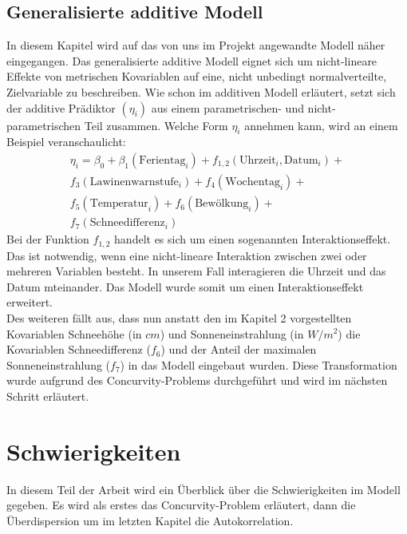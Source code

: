 \subsection{Generalisierte additive Modell}
In diesem Kapitel wird auf das von uns im Projekt angewandte Modell näher eingegangen. Das generalisierte additive Modell eignet sich um nicht-lineare Effekte von metrischen Kovariablen auf eine, nicht unbedingt normalverteilte, Zielvariable zu beschreiben. Wie schon im additiven Modell erläutert, setzt sich der additive Prädiktor $(\eta_{i})$ aus einem parametrischen- und nicht-parametrischen Teil zusammen. Welche Form $\eta_{i}$ annehmen kann, wird an einem Beispiel veranschaulicht:
\begin{align}
\eta_{i}=\beta_{0}+\beta_{1}(\text{Ferientag}_{i})+f_{1,2}(\text{Uhrzeit}_{i},\text{Datum}_{i})+ \nonumber \\
f_{3}(\text{Lawinenwarnstufe}_{i})+f_{4}(\text{Wochentag}_{i})+ \nonumber \\
f_{5}(\text{Temperatur}_{i})+f_{6}(\text{Bewölkung}_{i})+  \nonumber \\
f_{7}(\text{Schneedifferenz}_{i})
\end{align}
Bei der Funktion $f_{1,2}$ handelt es sich um einen sogenannten Interaktionseffekt. Das ist notwendig, wenn eine nicht-lineare Interaktion zwischen zwei oder mehreren Variablen besteht. In unserem Fall interagieren die Uhrzeit und das Datum mteinander. Das Modell wurde somit um einen Interaktionseffekt erweitert. \\
\noindent Des weiteren fällt aus, dass nun anstatt den im Kapitel 2 vorgestellten Kovariablen Schneehöhe (in $cm$) und Sonneneinstrahlung (in $W/m^2$) die Kovariablen Schneedifferenz ($f_{6}$) und der Anteil der maximalen Sonneneinstrahlung ($f_{7}$) in das Modell eingebaut wurden. Diese Transformation wurde aufgrund des Concurvity-Problems durchgeführt und wird im nächsten Schritt erläutert. 
\section{Schwierigkeiten}
In diesem Teil der Arbeit wird ein Überblick über die Schwierigkeiten im Modell gegeben. Es wird als erstes das Concurvity-Problem erläutert, dann die Überdispersion um im letzten Kapitel die Autokorrelation.
